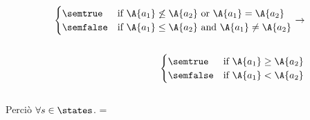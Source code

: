 {\begin{enumerate}[label=\alph*)]
\begin{itemize}
\begin{align*}
      \begin{cases}
      \semtrue &
      \mbox{if} \ \A{a_1} \not \leq \A{a_2}
                  \mbox{ or }
                  \A{a_1} = \A{a_2} \\
      \semfalse &
      \mbox{if} \ \A{a_1} \leq \A{a_2}
                  \mbox{ and }
                  \A{a_1} \neq \A{a_2} \\
      \end{cases}
      \rightarrow \\ \\
      \begin{cases}
      \semtrue &
      \mbox{if} \ \A{a_1} \geq \A{a_2} \\
      \semfalse &
      \mbox{if} \ \A{a_1} < \A{a_2} \\
      \end{cases}
    \end{align*} \\
      Perciò $\forall s \in \states$. =
       \\


\end{itemize}
\end{enumerate}}
